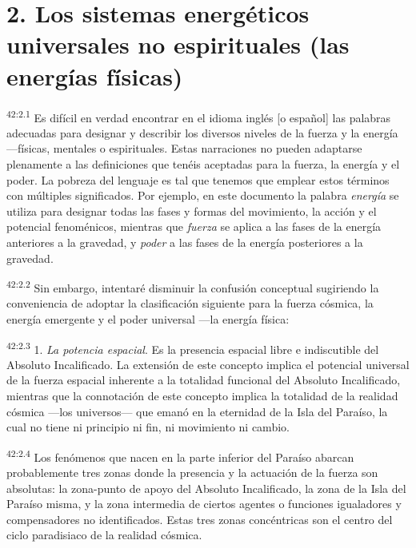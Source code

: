 \section*{2. Los sistemas energéticos universales no espirituales (las energías físicas)}
\par
\textsuperscript{42:2.1} Es difícil en verdad encontrar en el idioma inglés [o español] las palabras adecuadas para designar y describir los diversos niveles de la fuerza y la energía ---físicas, mentales o espirituales. Estas narraciones no pueden adaptarse plenamente a las definiciones que tenéis aceptadas para la fuerza, la energía y el poder. La pobreza del lenguaje es tal que tenemos que emplear estos términos con múltiples significados. Por ejemplo, en este documento la palabra \textit{energía} se utiliza para designar todas las fases y formas del movimiento, la acción y el potencial fenoménicos, mientras que \textit{fuerza} se aplica a las fases de la energía anteriores a la gravedad, y \textit{poder} a las fases de la energía posteriores a la gravedad.

\par
\textsuperscript{42:2.2} Sin embargo, intentaré disminuir la confusión conceptual sugiriendo la conveniencia de adoptar la clasificación siguiente para la fuerza cósmica, la energía emergente y el poder universal ---la energía física:

\par
\textsuperscript{42:2.3} 1. \textit{La potencia espacial}. Es la presencia espacial libre e indiscutible del Absoluto Incalificado. La extensión de este concepto implica el potencial universal de la fuerza espacial inherente a la totalidad funcional del Absoluto Incalificado, mientras que la connotación de este concepto implica la totalidad de la realidad cósmica ---los universos--- que emanó en la eternidad de la Isla del Paraíso, la cual no tiene ni principio ni fin, ni movimiento ni cambio.

\par
\textsuperscript{42:2.4} Los fenómenos que nacen en la parte inferior del Paraíso abarcan probablemente tres zonas donde la presencia y la actuación de la fuerza son absolutas: la zona-punto de apoyo del Absoluto Incalificado, la zona de la Isla del Paraíso misma, y la zona intermedia de ciertos agentes o funciones igualadores y compensadores no identificados. Estas tres zonas concéntricas son el centro del ciclo paradisiaco de la realidad cósmica.

